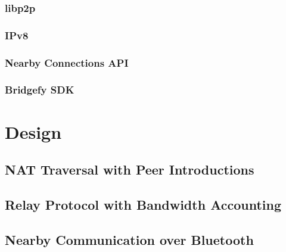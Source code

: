 \subsection{libp2p}

\subsection{IPv8}

\subsection{Nearby Connections API}

\subsection{Bridgefy SDK}

\chapter{Design}


\section{NAT Traversal with Peer Introductions}




\section{Relay Protocol with Bandwidth Accounting}

\section{Nearby Communication over Bluetooth}

